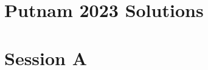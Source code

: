 \documentclass[11pt,a4paper]{article}
\begin{document}
	\newcommand{\la}{\leftarrow}
	\newcommand{\lra}{\leftrightarrow}
	\newcommand{\bbN}{{\mathbb N}}
	\newcommand{\bbZ}{{\mathbb Z}}
	\newcommand{\bbQ}{{\mathbb Q}}
	\newcommand{\bbR}{{\mathbb R}}
	\newcommand{\bbC}{{\mathbb C}}
	\newcommand{\bbH}{{\mathbb H}}
	\newcommand{\bbE}{{\mathbb E}}
	\newcommand{\bbP}{{\mathbb P}}
	\newcommand{\dfeq}{\stackrel{\mathrm{def}}{=}}
	\newcommand{\ra}{\rightarrow}
	\newcommand{\Span}{\mathrm{span}}
	\newcommand{\scrP}{\mathscr{P}}
	\newcommand{\rank}{\mathrm{rank}}
	\newcommand{\nullity}{\mathrm{nullity}}
	\newcommand{\Col}{\mathrm{Col}}
	\newcommand{\Row}{\mathrm{Row}}
	\newcommand{\tr}{\mathrm{tr}}
	\newcommand{\ol}{\overline}
	\newcommand{\norm}[1]{||#1||}
	\newcommand{\doubleline}[1]{\underline{\underline{#1}}}
	\newcommand{\elemop}[1]{\stackrel{#1}{\longrightarrow}}
	\newcommand{\Ind}{\mathrm{Ind}}
	\newcommand{\Res}{\mathrm{Res}}
	\newcommand{\End}{\mathrm{End}}
	\newcommand{\cl}{\mathrm{cl}}
	\newcommand{\code}[1]{\texttt{#1}}
	\newcommand\tab[1][0.5cm]{\hspace*{#1}}
	\newcommand{\<}{\langle}
	\renewcommand{\>}{\rangle}
	\newcommand{\qubits}[1]{|{#1}\rangle}
	\newcommand{\powset}{\mathcal{P}}
	\newcommand{\dsum}{\displaystyle\sum}
	\newcommand{\dprod}{\displaystyle\prod}
	
	\newtheorem{lemma}{Lemma}
	
	\section*{Putnam 2023 Solutions}
	
	\section*{Session A}
	
\end{document}
